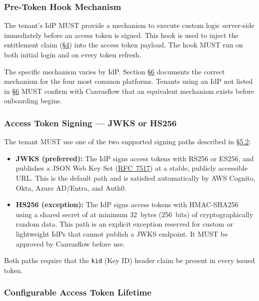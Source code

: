 \subsubsection{Pre-Token Hook Mechanism}

The tenant's IdP MUST provide a mechanism to execute custom logic server-side
immediately before an access token is signed. This hook is used to inject the
entitlement claim (\hyperref[sec:entitlement-mapping]{\S4}) into the access token payload. 
The hook MUST run on both initial login and on every token refresh.

The specific mechanism varies by IdP. Section \hyperref[sec:hook-configuration]{\S6} 
documents the correct mechanism for the four most common platforms. Tenants using 
an IdP not listed in \hyperref[sec:hook-configuration]{\S6} MUST confirm with 
Canvasflow that an equivalent mechanism exists before onboarding begins.

\subsubsection{Access Token Signing --- JWKS or HS256}

The tenant MUST use one of the two supported signing paths described 
in \hyperref[sec:signing-path-requirements]{\S5.2}:



\begin{itemize}
  \item \textbf{JWKS (preferred):} The IdP signs access tokens with RS256 or ES256, and
    publishes a JSON Web Key Set 
    (\href{https://datatracker.ietf.org/doc/html/rfc7517}{RFC~7517}) at a stable, 
    publicly accessible URL. This is the default path and is satisfied 
    automatically by AWS Cognito, Okta, Azure AD/Entra, and Auth0.

  \item \textbf{HS256 (exception):} The IdP signs access tokens with HMAC-SHA256 using
    a shared secret of at minimum 32~bytes (256~bits) of cryptographically random data.
    This path is an explicit exception reserved for custom or lightweight IdPs that
    cannot publish a JWKS endpoint. It MUST be approved by Canvasflow before use.
\end{itemize}

Both paths require that the \texttt{kid} (Key ID) header claim be present in every
issued token.

\subsubsection{Configurable Access Token Lifetime}

